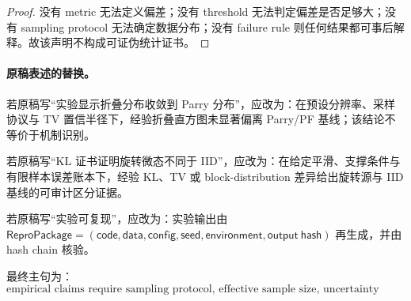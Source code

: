 \begin{proof}
没有 metric 无法定义偏差；没有 threshold 无法判定偏差是否足够大；没有 sampling protocol 无法确定数据分布；没有 failure rule 则任何结果都可事后解释。故该声明不构成可证伪统计证书。
\end{proof}

\paragraph{原稿表述的替换。}
若原稿写“实验显示折叠分布收敛到 Parry 分布”，应改为：在预设分辨率、采样协议与 TV 置信半径下，经验折叠直方图未显著偏离 Parry/PF 基线；该结论不等价于机制识别。

若原稿写“KL 证书证明旋转微态不同于 IID”，应改为：在给定平滑、支撑条件与有限样本误差账本下，经验 KL、TV 或 block-distribution 差异给出旋转源与 IID 基线的可审计区分证据。

若原稿写“实验可复现”，应改为：实验输出由 \(\mathsf{ReproPackage}=(\mathsf{code},\mathsf{data},\mathsf{config},\mathsf{seed},\mathsf{environment},\mathsf{output\ hash})\) 再生成，并由 hash chain 核验。

最终主句为：
\[
\boxed{
\text{empirical claims require sampling protocol, effective sample size, uncertainty radius, discrepancy rule, identifiability ledger, and reproducible hashes; plots alone are not audit certificates.}
}
\]
